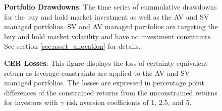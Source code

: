\clearpage
%	
\clearpage
\begin{figure}[!htb]
	\caption{{\bf Portfolio Drawdowns}: The time series of cummulative drawdowns for the buy and hold market investment as well as the AV and SV managed portfolios. SV and AV managed portfolios are targeting the buy and hold market volatility and have no investment constraints. See section \ref{sec:asset_allocation} for details.} \label{fig:fig_drawdowns}
	\vspace{-4mm}
	
\end{figure}
\clearpage
\begin{figure}[!htb]
		\caption{{\bf CER Losses}: This figure displays the loss of certainty equivalent return as leverage constraints are applied to the AV and SV managed portfolios. The losses are expressed in percentage point differences of the constrained returns from the unconstrained returns for investors with $\gamma$ risk aversion coefficients of 1, 2.5, and 5.} \label{fig:cer_loss}
		\begin{adjustbox}{width=\textwidth}
			
		\end{adjustbox}
	\end{figure}
\clearpage
\begin{figure}[!htb]
		\caption{{\bf CER Gains}: Certainity Equivalent Return gains for mean variance investors with risk aversion coefficients ranging from 1 to 5 and subject to investment constraints ranging from 1 to 3. See section \ref{sec:asset_allocation} for details.} \label{fig:cer_gain}
%		
	\begin{subfigure}{\textwidth}
		
	\end{subfigure}
	\begin{subfigure}{\textwidth}
		
	\end{subfigure}
\end{figure}
